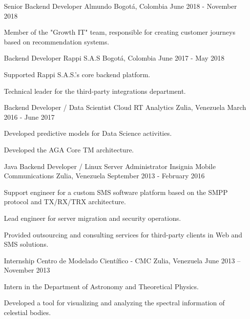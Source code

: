 \begin{cventries}
    \cventry
    {Senior Backend Developer}
    {Almundo}
    {Bogotá, Colombia}
    {June 2018 - November 2018}
    {
        \begin{cvitems}
            \item {Member of the "Growth IT" team, responsible for creating customer journeys based on recommendation systems.}
        \end{cvitems}
    }

    \cventry
    {Backend Developer}
    {Rappi S.A.S}
    {Bogotá, Colombia}
    {June 2017 - May 2018}
    {
        \begin{cvitems}
            \item {Supported Rappi S.A.S.'s core backend platform.}
            \item {Technical leader for the third-party integrations department.}
        \end{cvitems}
    }

    \cventry
    {Backend Developer / Data Scientist}
    {Cloud RT Analytics}
    {Zulia, Venezuela}
    {March 2016 - June 2017}
    {
        \begin{cvitems}
            \item {Developed predictive models for Data Science activities.}
            \item {Developed the AGA Core TM architecture.}
        \end{cvitems}
    }

    \cventry
    {Java Backend Developer / Linux Server Administrator}
    {Insignia Mobile Communications}
    {Zulia, Venezuela}
    {September 2013 - February 2016}
    {
        \begin{cvitems}
            \item {Support engineer for a custom SMS software platform based on the SMPP protocol and TX/RX/TRX architecture.}
            \item {Lead engineer for server migration and security operations.}
            \item {Provided outsourcing and consulting services for third-party clients in Web and SMS solutions.}
        \end{cvitems}
    }

    \cventry
    {Internship}
    {Centro de Modelado Científico - CMC}
    {Zulia, Venezuela}
    {June 2013 – November 2013}
    {
        \begin{cvitems}
            \item {Intern in the Department of Astronomy and Theoretical Physics.}
            \item {Developed a tool for visualizing and analyzing the spectral information of celestial bodies.}
        \end{cvitems}
    }
\end{cventries}
